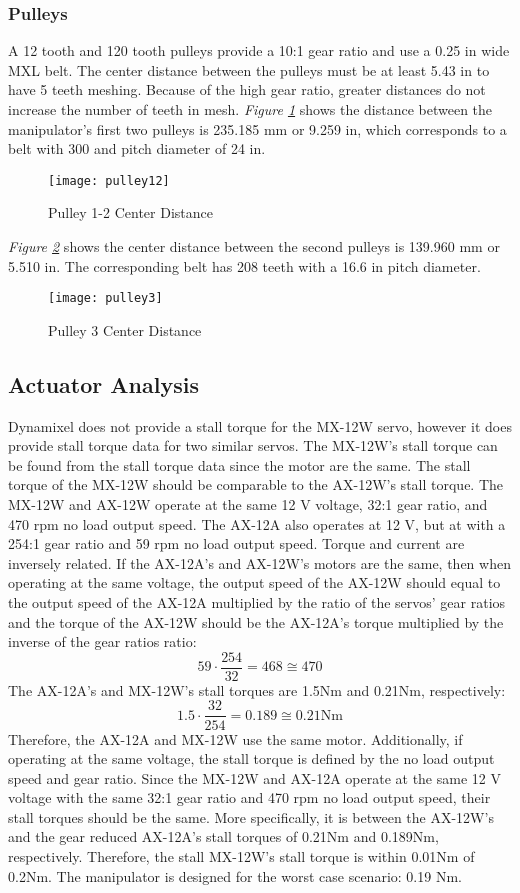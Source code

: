 \subsubsection{Pulleys}
A 12 tooth and 120 tooth pulleys provide a 10:1 gear ratio and use a 0.25 in wide MXL belt. The center distance between the pulleys must be at least 5.43 in to have 5 teeth meshing. Because of the high gear ratio, greater distances do not increase the number of teeth in mesh. \emph{Figure \ref{fig:pulley12}} shows the distance between the manipulator’s first two pulleys is 235.185 mm or 9.259 in, which corresponds to a belt with 300 and pitch diameter of 24 in.
\newpage
\begin{figure}[htp]
  \center
  \texttt{[image: pulley12]}
  \caption{Pulley 1-2 Center Distance}
  \label{fig:pulley12}
\end{figure}
\emph{Figure \ref{fig:pulley3}} shows the center distance between the second pulleys is 139.960 mm or 5.510 in. The corresponding belt has 208 teeth with a 16.6 in pitch diameter.
\begin{figure}[htp]
  \center
  \texttt{[image: pulley3]}
  \caption{Pulley 3 Center Distance}
  \label{fig:pulley3}
\end{figure}
\subsection{Actuator Analysis}
Dynamixel does not provide a stall torque for the MX-12W servo, however it does provide stall torque data for two similar servos. The MX-12W’s stall torque can be found from the stall torque data since the motor are the same. The stall torque of the MX-12W should be comparable to the AX-12W’s stall torque. The MX-12W and AX-12W operate at the same 12 V voltage, 32:1 gear ratio, and 470 rpm no load output speed. The AX-12A also operates at 12 V, but at with a 254:1 gear ratio and 59 rpm no load output speed. Torque and current are inversely related. If the AX-12A’s and AX-12W’s motors are the same, then when operating at the same voltage, the output speed of the AX-12W should equal to the output speed of the AX-12A multiplied by the ratio of the servos’ gear ratios and the torque of the AX-12W should be the AX-12A’s torque multiplied by the inverse of the gear ratios ratio:
\[ 59\cdot\frac{254}{32}=468 \cong 470 \]
The AX-12A’s and MX-12W’s stall torques are 1.5Nm and 0.21Nm, respectively:
\[ 1.5\cdot\frac{32}{254}=0.189\cong0.21\text{Nm} \]
Therefore, the AX-12A and MX-12W use the same motor. Additionally, if operating at the same voltage, the stall torque is defined by the no load output speed and gear ratio. Since the MX-12W and AX-12A operate at the same 12 V voltage with the same 32:1 gear ratio and 470 rpm no load output speed, their stall torques should be the same. More specifically, it is between the AX-12W’s and the gear reduced AX-12A’s stall torques of 0.21Nm and 0.189Nm, respectively. Therefore, the stall MX-12W’s stall torque is within 0.01Nm of 0.2Nm. The manipulator is designed for the worst case scenario: 0.19 Nm.

